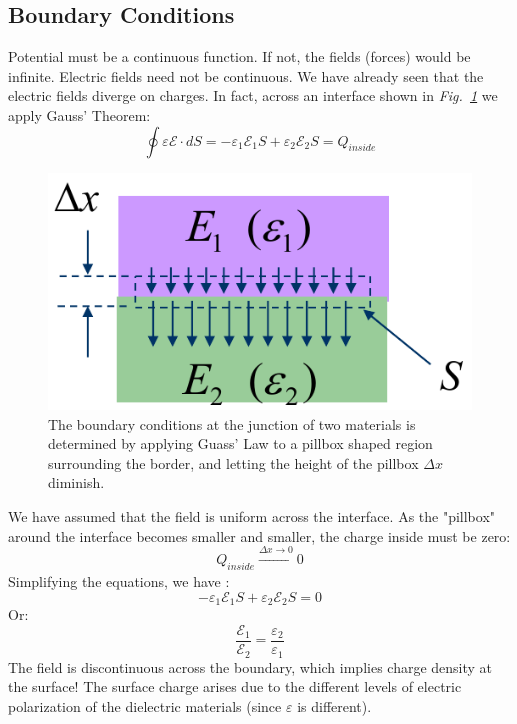 \subsection{Boundary Conditions}
Potential must be a continuous function. If not, the fields (forces) would be infinite.  Electric fields need not be continuous. We have already seen that the electric fields diverge on charges. In fact, across an interface shown in \emph{Fig.~\ref{fig:mod2-2_ICtech_sld_16}} we apply Gauss' Theorem: 
    \begin{equation} 
        \oint {\varepsilon \mathcal{E} \cdot dS = - {\varepsilon _1}{\mathcal{E}_1}S + {\varepsilon _2}{\mathcal{E}_2}S = {Q_{inside}}}
    \end{equation}
\begin{figure}[H]
\centering
\includegraphics[width=.35\columnwidth]{mod2-2_ICtech_sld_16}
\caption{The boundary conditions at the junction of two materials is determined by applying Guass' Law to a pillbox shaped region surrounding the border, and letting the height of the pillbox $\Delta x$ diminish.}
\label{fig:mod2-2_ICtech_sld_16}
\end{figure}
\noindent
We have assumed that the field is uniform across the interface.  As the "pillbox" around the interface becomes smaller and smaller, the charge inside must be zero:
    \begin{equation} 
        Q_{inside} \xrightarrow[]{\Delta x \rightarrow 0} 0 
    \end{equation}
Simplifying the equations, we have :
    \begin{equation}  
        - {\varepsilon _1}{\mathcal{E}_1}S + {\varepsilon _2}{\mathcal{E}_2}S = 0
    \end{equation}
Or:
    \begin{equation} 
        \frac{{{\mathcal{E}_1}}}{{{\mathcal{E}_2}}} = \frac{{{\varepsilon _2}}}{{{\varepsilon _1}}} 
    \end{equation}
The field is discontinuous across the boundary, which implies charge density at the surface!  The surface charge arises due to the different levels of electric polarization of the dielectric materials (since $\varepsilon$ is different).
\newpage
